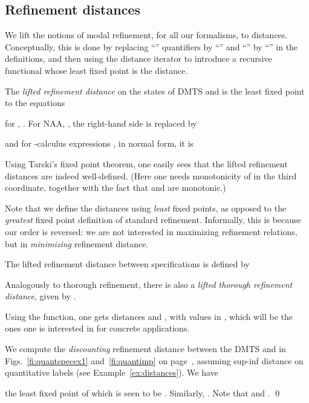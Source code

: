 \documentclass[twocolumn]{svjour3-dummy}
\newcommand*\NAA{NAA\xspace}
\begin{document}
\subsection{Refinement distances}

We lift the notions of modal refinement, for all our formalisms, to
distances.  Conceptually, this is done by replacing ``''
quantifiers by ``'' and ``'' by ``'' in the
definitions, and then using the distance iterator to introduce a
recursive functional whose least fixed point is the distance.

\begin{definition}
  \quad The \emph{lifted refinement distance} on the states of DMTS
    and  is the least fixed point to the equations
  
  for , .  For \NAA , , the right-hand side is
  replaced by
  
  and for -calculus expressions ,
   in normal form, it is
  
\end{definition}

Using Tarski's fixed point theorem, one easily sees that the lifted
refinement distances are indeed well-defined.  (Here one needs
monotonicity of  in the third coordinate, together with the fact that
 and  are monotonic.)

Note that we define the distances using \emph{least} fixed points, as
opposed to the \emph{greatest} fixed point definition of standard
refinement.  Informally, this is because our order is reversed: we are
not interested in maximizing refinement relations, but in
\emph{minimizing} refinement distance.

The lifted refinement distance between specifications is defined by

Analogously to thorough refinement, there is also a \emph{lifted
  thorough refinement distance}, given by  .

Using the  function, one gets distances 
and , with values in ,
which will be the ones one is interested in for concrete applications.

\begin{example}
  We compute the \emph{discounting} refinement distance between the DMTS
   and  in Figs.~\ref{fi:quantspecex1} and~\ref{fi:quantimp} on
  page~\pageref{fi:quantspecex1}, assuming sup-inf distance on
  quantitative labels (see Example~\ref{ex:distances}).  We have
  
  the least fixed point of which is seen to be .  Similarly, .  Note that  and . \qed
\end{example}
\end{document}
